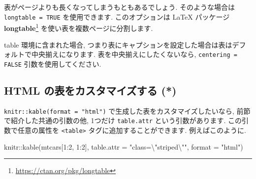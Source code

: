 \documentclass[
  11pt,
]{bxjsreport}
\newenvironment{Shaded}{\begin{snugshade}}{\end{snugshade}}
\newcommand{\AttributeTok}[1]{\textcolor[rgb]{0.77,0.63,0.00}{#1}}
\newcommand{\DecValTok}[1]{\textcolor[rgb]{0.00,0.00,0.81}{#1}}
\newcommand{\FunctionTok}[1]{\textcolor[rgb]{0.00,0.00,0.00}{#1}}
\newcommand{\NormalTok}[1]{#1}
\newcommand{\SpecialCharTok}[1]{\textcolor[rgb]{0.00,0.00,0.00}{#1}}
\newcommand{\StringTok}[1]{\textcolor[rgb]{0.31,0.60,0.02}{#1}}
\renewcommand{\href}[2]{#2\footnote{\url{#1}}}
\begin{document}
表がページよりも長くなってしまうもともあるでしょう. そのような場合は \texttt{longtable = TRUE} を使用できます. このオプションは LaTeX パッケージ \href{https://ctan.org/pkg/longtable}{\textbf{longtable}} を使い表を複数ページに分割します.

table 環境に含まれた場合, つまり表にキャプションを設定した場合は表はデフォルトで中央揃えになります. 表を中央揃えにしたくないなら, \texttt{centering = FALSE} 引数を使用してください.

\hypertarget{customize-html-tables}{%
\subsection{HTML の表をカスタマイズする (*)}\label{customize-html-tables}}

\texttt{knitr::kable(format = "html")} で生成した表をカスタマイズしたいなら, 前節で紹介した共通の引数の他, 1つだけ \texttt{table.attr} という引数があります. この引数で任意の属性を \texttt{\textless{}table\textgreater{}} タグに追加することができます. 例えばこのように.

\begin{Shaded}
\begin{Highlighting}[numbers=left,,]
\NormalTok{knitr}\SpecialCharTok{::}\FunctionTok{kable}\NormalTok{(mtcars[}\DecValTok{1}\SpecialCharTok{:}\DecValTok{2}\NormalTok{, }\DecValTok{1}\SpecialCharTok{:}\DecValTok{2}\NormalTok{], }\AttributeTok{table.attr =} \StringTok{"class=}\SpecialCharTok{\textbackslash{}"}\StringTok{striped}\SpecialCharTok{\textbackslash{}"}\StringTok{"}\NormalTok{, }
  \AttributeTok{format =} \StringTok{"html"}\NormalTok{)}
\end{Highlighting}
\end{Shaded}
\end{document}
